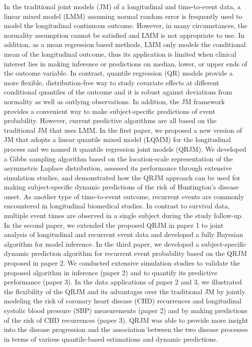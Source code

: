 \indent
In the traditional joint models (JM) of a longitudinal and time-to-event data, a linear mixed model (LMM) assuming normal random error is frequently used to model the longitudinal continuous outcome. However, in many circumstances, the normality assumption cannot be satisfied and LMM is not appropriate to use. In addition, as a mean regression based methods, LMM only models the conditional mean of the longitudinal outcome, thus its application is limited when clinical interest lies in making inference or predictions on median, lower, or upper ends of the outcome variable. In contrast, quantile regression (QR) models provide a more flexible, distribution-free way to study covariate effects at different conditional quantiles of the outcome and it is robust against deviations from normality as well as outlying observations. In addition, the JM framework provides a convenient way to make subject-specific predictions of event probability. However, current predictive algorithms are all based on the traditional JM that uses LMM. In the first paper, we proposed a new version of JM that adopts a linear quantile mixed model (LQMM) for the longitudinal process and we named it quantile regression joint models (QRJM). We developed a Gibbs sampling algorithm based on the location-scale representation of the asymmetric Laplace distribution, assessed its performance through extensive simulation studies, and demonstrated how the QRJM approach can be used for making subject-specific dynamic predictions of the risk of Huntington's disease onset. As another type of time-to-event outcome, recurrent events are commonly encountered in longitudinal biomedical studies. In contrast to survival data, multiple event times are observed in a single subject during the study follow-up. In the second paper, we extended the proposed QRJM in paper 1 to joint analysis of longitudinal and recurrent event data and developed a fully Bayesian algorithm for model inference. In the third paper, we developed a subject-specific dynamic prediction algorithm for recurrent event probability based on the QRJM proposed in paper 2. We conducted extensive simulation studies to validate the proposed algorithm in inference (paper 2) and to quantify its predictive performance (paper 3). In the data applications of paper 2 and 3, we illustrated the flexibility of the QRJM and its advantages over the traditional JM by jointly modeling the risk of coronary heart disease (CHD) recurrences and longitudinal systolic blood pressure (SBP) measurements (paper 2) and by making predictions of the risk of CHD recurrences (paper 3). QRJM was able to provide more insight into the disease progression and the association between the two disease processes in terms of various quantile-based estimations and dynamic predictions.

